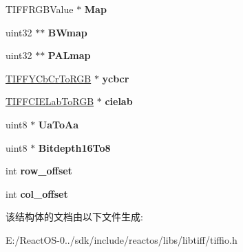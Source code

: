 \begin{DoxyCompactItemize}
\begin{tabbing}
\end{tabbing}\item 
\mbox{\label{struct___t_i_f_f_r_g_b_a_image_acfb21041e1a1e957b161a63e4fa1bded}} 
T\+I\+F\+F\+R\+G\+B\+Value $\ast$ {\bfseries Map}
\item 
\mbox{\label{struct___t_i_f_f_r_g_b_a_image_a5f0552051d7310c767121c8c9f201ee8}} 
uint32 $\ast$$\ast$ {\bfseries B\+Wmap}
\item 
\mbox{\label{struct___t_i_f_f_r_g_b_a_image_ac3a6055074fc3d27afcdb19fc72e97b1}} 
uint32 $\ast$$\ast$ {\bfseries P\+A\+Lmap}
\item 
\mbox{\label{struct___t_i_f_f_r_g_b_a_image_ad473f57aadb7094737206cf11b69f7b7}} 
\hyperlink{struct_t_i_f_f_y_cb_cr_to_r_g_b}{T\+I\+F\+F\+Y\+Cb\+Cr\+To\+R\+GB} $\ast$ {\bfseries ycbcr}
\item 
\mbox{\label{struct___t_i_f_f_r_g_b_a_image_a8094feddeb58a6cb4cf70b3df94b7167}} 
\hyperlink{struct_t_i_f_f_c_i_e_lab_to_r_g_b}{T\+I\+F\+F\+C\+I\+E\+Lab\+To\+R\+GB} $\ast$ {\bfseries cielab}
\item 
\mbox{\label{struct___t_i_f_f_r_g_b_a_image_af7b133dcc43eaaba3e6de8bc77bcbaf0}} 
uint8 $\ast$ {\bfseries Ua\+To\+Aa}
\item 
\mbox{\label{struct___t_i_f_f_r_g_b_a_image_a3e0c614d44092f557e9a2fb343ab8f7d}} 
uint8 $\ast$ {\bfseries Bitdepth16\+To8}
\item 
\mbox{\label{struct___t_i_f_f_r_g_b_a_image_ad2937ef47ec09a83a258eb334a9bdc73}} 
int {\bfseries row\+\_\+offset}
\item 
\mbox{\label{struct___t_i_f_f_r_g_b_a_image_a00af752d49bec701cd61afd6460af99f}} 
int {\bfseries col\+\_\+offset}
\end{DoxyCompactItemize}


该结构体的文档由以下文件生成\+:\begin{DoxyCompactItemize}
\item 
E\+:/\+React\+O\+S-\/0../sdk/include/reactos/libs/libtiff/tiffio.\+h\end{DoxyCompactItemize}
